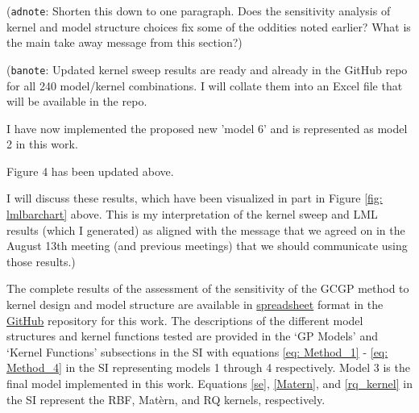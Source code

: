\documentclass[journal=jacsat,manuscript=article, ]{achemso}
\newcommand{\adnote}[1]{{\color{OliveGreen} (\texttt{adnote}: #1)}}
\newcommand{\banote}[1]{{\color{Salmon} (\texttt{banote}: #1)}}
\begin{document}
\adnote{Shorten this down to one paragraph. Does the sensitivity analysis of kernel and model structure choices fix some of the oddities noted earlier? What is the main take away message from this section?}

\banote{Updated kernel sweep results are ready and already in the GitHub repo for all 240 model/kernel combinations. I will collate them into an Excel file that will be available in the repo. 

I have now implemented the proposed new 'model 6' and is represented as model 2 in this work.

Figure 4 has been updated above.

I will discuss these results, which have been visualized in part in Figure \ref{fig: lmlbarchart} above. This is my interpretation of the kernel sweep and LML results (which I generated) as aligned with the message that we agreed on in the August 13th meeting (and previous meetings) that we should communicate using those results.}

The complete results of the assessment of the sensitivity of the GCGP method to kernel design and model structure are available in \href{https://github.com/MaginnGroup/GCGP/blob/master/kernel_sweep_code_and_results/kernel_sweep_combined_results.csv}{spreadsheet}  format in the \href{https://github.com/MaginnGroup/GCGP/tree/master}{GitHub} repository for this work. 
The descriptions of the different model structures and kernel functions tested are provided in the `GP Models' and `Kernel Functions' subsections in the SI with equations \ref{eq: Method_1} - \ref{eq: Method_4} in the SI representing models 1 through 4 respectively. Model 3 is the final model implemented in this work. Equations \ref{se}, \ref{Matern}, and \ref{rq_kernel} in the SI represent the RBF, Mat\`ern, and RQ kernels, respectively.
\end{document}
